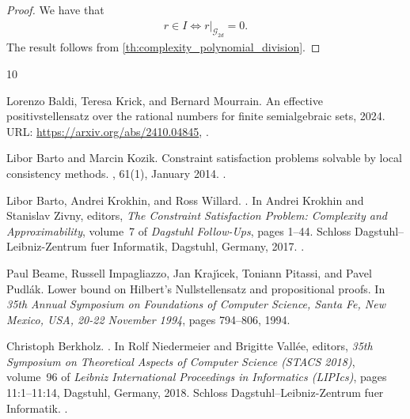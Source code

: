 \documentclass[11pt]{article}
\newcommand{\1}{\textbf{1}}
\begin{document}
\begin{proof}
    We have that 
    \begin{align*}
        r \in I \iff r|_{\mathcal{G}_{2d}} = 0.
    \end{align*}
    The result follows from \cref{th:complexity_polynomial_division}.
\end{proof}


\begin{thebibliography}{10}

Lorenzo Baldi, Teresa Krick, and Bernard Mourrain.
\newblock An effective positivstellensatz over the rational numbers for finite semialgebraic sets, 2024.
\newblock URL: \url{https://arxiv.org/abs/2410.04845}, \href {https://arxiv.org/abs/2410.04845} {}.

Libor Barto and Marcin Kozik.
\newblock Constraint satisfaction problems solvable by local consistency methods.
, 61(1), January 2014.
\newblock \href {https://doi.org/10.1145/2556646} {}.

Libor Barto, Andrei Krokhin, and Ross Willard.
.
\newblock In Andrei Krokhin and Stanislav Zivny, editors, {\em The Constraint Satisfaction Problem: Complexity and Approximability}, volume~7 of {\em Dagstuhl Follow-Ups}, pages 1--44. Schloss Dagstuhl--Leibniz-Zentrum fuer Informatik, Dagstuhl, Germany, 2017.
\newblock \href {https://doi.org/10.4230/DFU.Vol7.15301.1} {}.

Paul Beame, Russell Impagliazzo, Jan Kraj{\'{\i}}cek, Toniann Pitassi, and Pavel Pudl{\'{a}}k.
\newblock Lower bound on {H}ilbert's {N}ullstellensatz and propositional proofs.
\newblock In {\em 35th Annual Symposium on Foundations of Computer Science, Santa Fe, New Mexico, USA, 20-22 November 1994}, pages 794--806, 1994.

Christoph Berkholz.
.
\newblock In Rolf Niedermeier and Brigitte Vall{\'e}e, editors, {\em 35th Symposium on Theoretical Aspects of Computer Science (STACS 2018)}, volume~96 of {\em Leibniz International Proceedings in Informatics (LIPIcs)}, pages 11:1--11:14, Dagstuhl, Germany, 2018. Schloss Dagstuhl--Leibniz-Zentrum fuer Informatik.
\newblock \href {https://doi.org/10.4230/LIPIcs.STACS.2018.11} {}.


\end{thebibliography}
\end{document}
